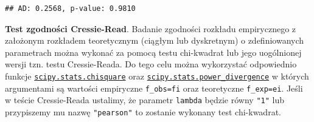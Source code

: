 \documentclass[polish,]{book}
\newenvironment{Shaded}{\begin{snugshade}}{\end{snugshade}}
\newcommand{\BuiltInTok}[1]{#1}
\newcommand{\ControlFlowTok}[1]{\textcolor[rgb]{0.13,0.29,0.53}{\textbf{#1}}}
\newcommand{\DecValTok}[1]{\textcolor[rgb]{0.00,0.00,0.81}{#1}}
\newcommand{\FloatTok}[1]{\textcolor[rgb]{0.00,0.00,0.81}{#1}}
\newcommand{\ImportTok}[1]{#1}
\newcommand{\KeywordTok}[1]{\textcolor[rgb]{0.13,0.29,0.53}{\textbf{#1}}}
\newcommand{\NormalTok}[1]{#1}
\newcommand{\OperatorTok}[1]{\textcolor[rgb]{0.81,0.36,0.00}{\textbf{#1}}}
\newcommand{\SpecialCharTok}[1]{\textcolor[rgb]{0.00,0.00,0.00}{#1}}
\newcommand{\StringTok}[1]{\textcolor[rgb]{0.31,0.60,0.02}{#1}}
\newcommand{\VariableTok}[1]{\textcolor[rgb]{0.00,0.00,0.00}{#1}}
\begin{document}
\begin{Shaded}
\end{Shaded}

\begin{verbatim}
## AD: 0.2568, p-value: 0.9810
\end{verbatim}

\textbf{Test zgodności Cressie-Read}. Badanie zgodności rozkładu empirycznego z założonym rozkładem teoretycznym (ciągłym lub dyskretnym) o zdefiniowanych parametrach można wykonać za pomocą testu chi-kwadrat lub jego uogólnionej wersji tzn. testu Cressie-Reada. Do tego celu można wykorzystać odpowiednio funkcje \href{https://docs.scipy.org/doc/scipy/reference/generated/scipy.stats.chisquare.html}{\texttt{scipy.stats.chisquare}} oraz \href{https://docs.scipy.org/doc/scipy/reference/generated/scipy.stats.power_divergence.html}{\texttt{scipy.stats.power\_divergence}} w których argumentami są wartości empiryczne \texttt{f\_obs=fi} oraz teoretyczne \texttt{f\_exp=ei}.
Jeśli w teście Cressie-Reada ustalimy, że parametr \texttt{lambda} będzie równy \texttt{"1"} lub przypiszemy mu nazwę \texttt{"pearson"} to zostanie wykonany test chi-kwadrat.
\end{document}
